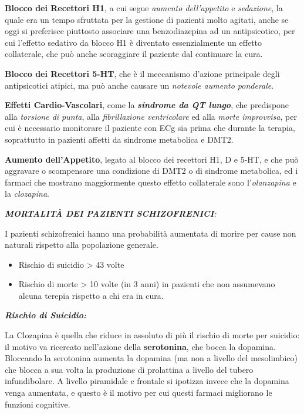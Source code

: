 \documentclass[]{article}
\begin{document}
\textbf{Blocco dei Recettori H1}, a cui segue \emph{aumento
dell'appetito} e \emph{sedazione}, la quale era un tempo sfruttata per
la gestione di pazienti molto agitati, anche se oggi si preferisce
piuttosto associare una benzodiazepina ad un antipsicotico, per cui
l'effetto sedativo da blocco H1 è diventato essenzialmente un effetto
collaterale, che può anche scoraggiare il paziente dal continuare la
cura.

\textbf{Blocco dei Recettori 5-HT}, che è il meccanismo d'azione
principale degli antipsicotici atipici, ma può anche causare un
\emph{notevole aumento ponderale}.

\textbf{Effetti Cardio-Vascolari}, come la \textbf{\emph{sindrome da QT
lungo}}, che predispone alla \emph{torsione di punta}, alla
\emph{fibrillazione ventricolare} ed alla \emph{morte improvvisa}, per
cui è necessario monitorare il paziente con ECg sia prima che durante la
terapia, soprattutto in pazienti affetti da sindrome metabolica e DMT2.

\textbf{Aumento dell'Appetito}, legato al blocco dei recettori H1, D e
5-HT, e che può aggravare o scompensare una condizione di DMT2 o di
sindrome metabolica, ed i farmaci che mostrano maggiormente questo
effetto collaterale sono l'\emph{olanzapina} e la \emph{clozapina}.

\emph{\textbf{MORTALITÀ DEI PAZIENTI SCHIZOFRENICI}:}

I pazienti schizofrenici hanno una probabilità aumentata di morire per
cause non naturali rispetto alla popolazione generale.

\begin{itemize}
\item
  Rischio di suicidio \textgreater{} 43 volte
\item
  Rischio di morte \textgreater{} 10 volte (in 3 anni) in pazienti che
  non assumevano alcuna terepia rispetto a chi era in cura.
\end{itemize}

\textbf{\emph{Rischio di Suicidio:}}

La Clozapina è quella che riduce in assoluto di più il rischio di morte
per suicidio: il motivo va ricercato nell'azione della
\textbf{serotonina}, che bocca la dopamina. Bloccando la serotonina
aumenta la dopamina (ma non a livello del mesolimbico) che blocca a sua
volta la produzione di prolattina a livello del tubero infundibolare. A
livello piramidale e frontale si ipotizza invece che la dopamina venga
aumentata, e questo è il motivo per cui questi farmaci migliorano le
funzioni cognitive.
\end{document}
